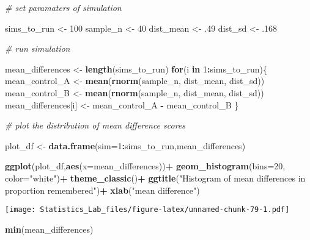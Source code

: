 \documentclass[
]{book}
\newenvironment{Shaded}{\begin{snugshade}}{\end{snugshade}}
\newcommand{\AttributeTok}[1]{\textcolor[rgb]{0.13,0.29,0.53}{#1}}
\newcommand{\CommentTok}[1]{\textcolor[rgb]{0.56,0.35,0.01}{\textit{#1}}}
\newcommand{\ControlFlowTok}[1]{\textcolor[rgb]{0.13,0.29,0.53}{\textbf{#1}}}
\newcommand{\DecValTok}[1]{\textcolor[rgb]{0.00,0.00,0.81}{#1}}
\newcommand{\FunctionTok}[1]{\textcolor[rgb]{0.13,0.29,0.53}{\textbf{#1}}}
\newcommand{\NormalTok}[1]{#1}
\newcommand{\OtherTok}[1]{\textcolor[rgb]{0.56,0.35,0.01}{#1}}
\newcommand{\SpecialCharTok}[1]{\textcolor[rgb]{0.81,0.36,0.00}{\textbf{#1}}}
\newcommand{\StringTok}[1]{\textcolor[rgb]{0.31,0.60,0.02}{#1}}
\begin{document}
\begin{Shaded}
\begin{Highlighting}[]
\CommentTok{\# set paramaters of simulation}

\NormalTok{sims\_to\_run }\OtherTok{\textless{}{-}} \DecValTok{100}
\NormalTok{sample\_n   }\OtherTok{\textless{}{-}} \DecValTok{40}
\NormalTok{dist\_mean  }\OtherTok{\textless{}{-}}\NormalTok{ .}\DecValTok{49}
\NormalTok{dist\_sd    }\OtherTok{\textless{}{-}}\NormalTok{ .}\DecValTok{168}

\CommentTok{\# run simulation}

\NormalTok{mean\_differences }\OtherTok{\textless{}{-}} \FunctionTok{length}\NormalTok{(sims\_to\_run)}
\ControlFlowTok{for}\NormalTok{(i }\ControlFlowTok{in} \DecValTok{1}\SpecialCharTok{:}\NormalTok{sims\_to\_run)\{}
\NormalTok{  mean\_control\_A      }\OtherTok{\textless{}{-}} \FunctionTok{mean}\NormalTok{(}\FunctionTok{rnorm}\NormalTok{(sample\_n, dist\_mean, dist\_sd))}
\NormalTok{  mean\_control\_B      }\OtherTok{\textless{}{-}} \FunctionTok{mean}\NormalTok{(}\FunctionTok{rnorm}\NormalTok{(sample\_n, dist\_mean, dist\_sd))}
\NormalTok{  mean\_differences[i] }\OtherTok{\textless{}{-}}\NormalTok{ mean\_control\_A }\SpecialCharTok{{-}}\NormalTok{ mean\_control\_B}
\NormalTok{\}}

\CommentTok{\# plot the  distribution of mean difference scores}

\NormalTok{plot\_df }\OtherTok{\textless{}{-}} \FunctionTok{data.frame}\NormalTok{(}\AttributeTok{sim=}\DecValTok{1}\SpecialCharTok{:}\NormalTok{sims\_to\_run,mean\_differences)}

\FunctionTok{ggplot}\NormalTok{(plot\_df,}\FunctionTok{aes}\NormalTok{(}\AttributeTok{x=}\NormalTok{mean\_differences))}\SpecialCharTok{+}
  \FunctionTok{geom\_histogram}\NormalTok{(}\AttributeTok{bins=}\DecValTok{20}\NormalTok{, }\AttributeTok{color=}\StringTok{"white"}\NormalTok{)}\SpecialCharTok{+}
  \FunctionTok{theme\_classic}\NormalTok{()}\SpecialCharTok{+}
  \FunctionTok{ggtitle}\NormalTok{(}\StringTok{"Histogram of mean differences in proportion remembered"}\NormalTok{)}\SpecialCharTok{+}
  \FunctionTok{xlab}\NormalTok{(}\StringTok{"mean difference"}\NormalTok{)}
\end{Highlighting}
\end{Shaded}

\texttt{[image: Statistics\_Lab\_files/figure-latex/unnamed-chunk-79-1.pdf]}

\begin{Shaded}
\begin{Highlighting}[]
\FunctionTok{min}\NormalTok{(mean\_differences)}
\end{Highlighting}
\end{Shaded}
\end{document}

